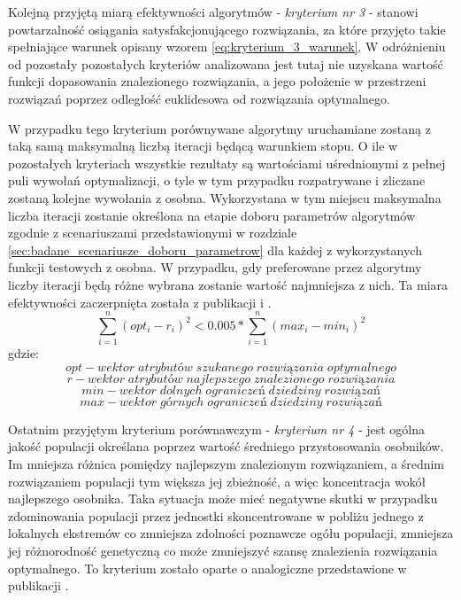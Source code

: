 \par 
Kolejną przyjętą miarą efektywności algorytmów - \emph{kryterium nr 3} - stanowi powtarzalność osiągania satysfakcjonującego rozwiązania, za które przyjęto takie spełniające warunek opisany wzorem \ref{eq:kryterium_3_warunek}. W odróżnieniu od pozostały pozostałych kryteriów analizowana jest tutaj nie uzyskana wartość funkcji dopasowania znalezionego rozwiązania, a jego położenie w przestrzeni rozwiązań poprzez odległość euklidesowa od rozwiązania optymalnego.
\par 
W przypadku tego kryterium porównywane algorytmy uruchamiane zostaną z taką samą maksymalną liczbą iteracji będącą warunkiem stopu. O ile w pozostałych kryteriach wszystkie rezultaty są wartościami uśrednionymi z pełnej puli wywołań optymalizacji, o tyle w tym przypadku rozpatrywane i zliczane zostaną kolejne wywołania z osobna. Wykorzystana w tym miejscu maksymalna liczba iteracji zostanie określona na etapie doboru parametrów algorytmów zgodnie z scenariuszami przedstawionymi w rozdziale \ref{sec:badane_scenariusze_doboru_parametrow} dla każdej z wykorzystanych funkcji testowych z osobna. W przypadku, gdy preferowane przez algorytmy liczby iteracji będą różne wybrana zostanie wartość najmniejsza z nich. Ta miara efektywności zaczerpnięta została z publikacji \cite{elbeltagi2005comparison} i \cite{mullen2014continuous}. 
\begin{equation} \label{eq:kryterium_3_warunek}
\sum_{i=1}^{n}\left(opt_i-r_i\right)^2 < 0.005*\sum_{i=1}^{n}\left(max_i-min_i\right)^2
\end{equation}
gdzie:
\[opt - wektor\; atrybutów\; szukanego\; rozwiązania\; optymalnego\]
\[r - wektor\; atrybutów\; najlepszego\; znalezionego\; rozwiązania\]
\[min - wektor\; dolnych\; ograniczeń\; dziedziny\; rozwiązań\]
\[max - wektor\; górnych\; ograniczeń\; dziedziny\; rozwiązań\]

\par 
Ostatnim przyjętym kryterium porównawczym - \emph{kryterium nr 4} - jest ogólna jakość populacji określana poprzez wartość średniego przystosowania osobników. Im mniejsza różnica pomiędzy najlepszym znalezionym rozwiązaniem, a średnim rozwiązaniem populacji tym większa jej zbieżność, a więc koncentracja wokół najlepszego osobnika. Taka sytuacja może mieć negatywne skutki w przypadku zdominowania populacji przez jednostki skoncentrowane w pobliżu jednego z lokalnych ekstremów co zmniejsza zdolności poznawcze ogółu populacji, zmniejsza jej różnorodność genetyczną co może zmniejszyć szansę znalezienia rozwiązania optymalnego. To kryterium zostało oparte o analogiczne przedstawione w publikacji \cite{ong2006classification}.



